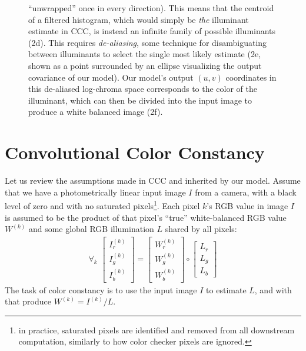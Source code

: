 \documentclass[10pt,twocolumn,letterpaper]{article}
\begin{document}
\begin{figure}[!]
{    ``unwrapped'' once in every direction). This means that the
    centroid of a filtered histogram, which would simply be \emph{the} illuminant
    estimate in CCC, is instead an infinite family of possible illuminants (2d).
    This requires \emph{de-aliasing}, some technique for disambiguating between
    illuminants to select the single most likely estimate
    (2e, shown as a point surrounded by an ellipse visualizing
    the output covariance of our model).
    Our model's output $(u, v)$ coordinates in this de-aliased log-chroma space
    corresponds to the color of the illuminant, which can then be divided
    into the input image to produce a white balanced image (2f).
    \label{fig:overview}
    }
\end{figure}

\section{Convolutional Color Constancy}
\label{sec:ccc}

Let us review the assumptions made in CCC and inherited by our model.
Assume that we have a photometrically linear input image $I$ from a camera,
with a black level of zero and with no saturated
pixels\footnote{in practice, saturated pixels are identified and removed from all
downstream computation, similarly to how color checker pixels are ignored.}.
Each pixel $k$'s RGB value in image $I$ is assumed to be the product of that
pixel's ``true'' white-balanced RGB value $W^{(k)}$
and some global RGB illumination $L$ shared by all pixels:
\begin{align}
\forall_k \,\,
\begin{bmatrix} I_r^{(k)} \\ I_g^{(k)} \\ I_b^{(k)} \end{bmatrix} = \begin{bmatrix} W_r^{(k)} \\ W_g^{(k)} \\ W_b^{(k)} \end{bmatrix} \circ \begin{bmatrix} L_r \\ L_g \\ L_b \end{bmatrix}
\label{eq:image_formation_rgb}
\end{align}
The task of color constancy is to use the input image $I$ to estimate $L$, and
with that produce $W^{(k)} = I^{(k)} / L$.
\end{document}
